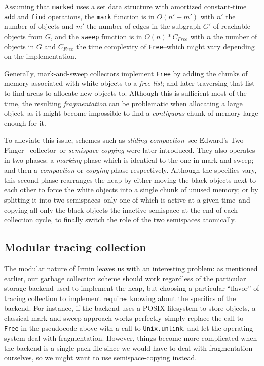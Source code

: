 Assuming that \texttt{marked} uses a set data structure with amortized constant-time \texttt{add} and \texttt{find} operations, the \texttt{mark} function is in \(O(n' + m')\) with \(n'\) the number of objects and \(m'\) the number of edges in the subgraph \(G'\) of reachable objects from \(G\), and the \texttt{sweep} function is in \(O(n) * C_{Free}\) with \(n\) the number of objects in \(G\) and \(C_{Free}\) the time complexity of \texttt{Free}--which might vary depending on the implementation.

Generally, mark-and-sweep collectors implement \texttt{Free} by adding the chunks of memory associated with white objects to a \emph{free-list}; and later traversing that list to find areas to allocate new objects to. Although this is sufficient most of the time, the resulting \emph{fragmentation} can be problematic when allocating a large object, as it might become impossible to find a \emph{contiguous} chunk of memory large enough for it.

To alleviate this issue, schemes such as \emph{sliding compaction}--see Edward's Two-Finger~\cite{saunders74} collector--or \emph{semispace copying} were later introduced. They also operates in two phases: a \emph{marking} phase which is identical to the one in mark-and-sweep; and then a \emph{compaction} or \emph{copying} phase respectively. Although the specifics vary, this second phase rearranges the heap by either moving the black objects next to each other to force the white objects into a single chunk of unused memory; or by splitting it into two semispaces--only one of which is active at a given time--and copying all only the black objects the inactive semispace at the end of each collection cycle, to finally switch the role of the two semispaces atomically.

\subsection{Modular tracing collection}

The modular nature of Irmin leaves us with an interesting problem: as mentioned earlier, our garbage collection scheme should work regardless of the particular storage backend used to implement the heap, but choosing a particular ``flavor'' of tracing collection to implement requires knowing about the specifics of the backend. For instance, if the backend uses a POSIX filesystem to store objects, a classical mark-and-sweep approach works perfectly--simply replace the call to \texttt{Free} in the pseudocode above with a call to \texttt{Unix.unlink}, and let the operating system deal with fragmentation. However, things become more complicated when the backend is a single pack-file since we would have to deal with fragmentation ourselves, so we might want to use semispace-copying instead.

